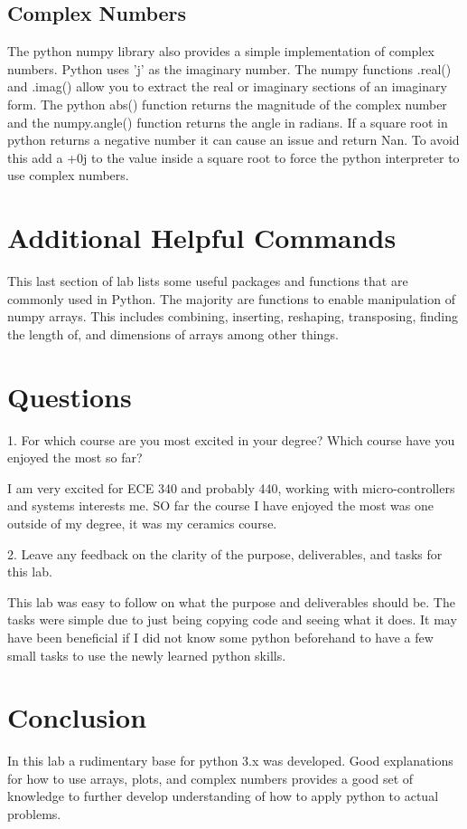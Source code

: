 \documentclass{article}
\begin{document}
\subsection{Complex Numbers}
The python numpy library also provides a simple implementation of complex numbers. Python uses 'j' as the imaginary number. The numpy functions .real() and .imag() allow you to extract the real or imaginary sections of an imaginary form. The python abs() function returns the magnitude of the complex number and the numpy.angle() function returns the angle in radians. If a square root in python returns a negative number it can cause an issue and return Nan. To avoid this add a +0j to the value inside a square root to force the python interpreter to use complex numbers. 
\section{Additional Helpful Commands}
This last section of lab lists some useful packages and functions that are commonly used in Python. The majority are functions to enable manipulation of numpy arrays. This includes combining, inserting, reshaping, transposing, finding the length of, and dimensions of arrays among other things.
\section{Questions}
1. For which course are you most excited in your degree? Which course have you enjoyed the most so far?

I am very excited for ECE 340 and probably 440, working with micro-controllers and systems interests me. SO far the course I have enjoyed the most was one outside of my degree, it was my ceramics course.

2. Leave any feedback on the clarity of the purpose, deliverables, and tasks for this lab.

This lab was easy to follow on what the purpose and deliverables should be. The tasks were simple due to just being copying code and seeing what it does. It may have been beneficial if I did not know some python beforehand to have a few small tasks to use the newly learned python skills.

\section{Conclusion}
In this lab a rudimentary base for python 3.x was developed. Good explanations for how to use arrays, plots, and complex numbers provides a good set of knowledge to further develop understanding of how to apply python to actual problems.
\end{document}
